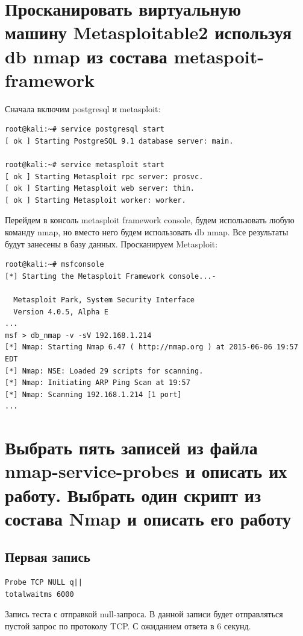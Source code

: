 \documentclass[utf8x, 12pt]{G7-32}
\begin{document}
 \newpage
\section{Просканировать виртуальную машину Metasploitable2 используя db nmap из состава metaspoit-framework}

Сначала включим postgresql и metasploit:

\begin{lstlisting}
root@kali:~# service postgresql start
[ ok ] Starting PostgreSQL 9.1 database server: main.

root@kali:~# service metasploit start
[ ok ] Starting Metasploit rpc server: prosvc.
[ ok ] Starting Metasploit web server: thin.
[ ok ] Starting Metasploit worker: worker.
\end{lstlisting}

Перейдем в консоль metasploit framework console, будем использовать любую команду nmap, но вместо него будем использовать db nmap. Все результаты будут занесены в базу данных. Просканируем Metasploit:

\begin{lstlisting}
root@kali:~# msfconsole
[*] Starting the Metasploit Framework console...-

  Metasploit Park, System Security Interface
  Version 4.0.5, Alpha E
...
msf > db_nmap -v -sV 192.168.1.214
[*] Nmap: Starting Nmap 6.47 ( http://nmap.org ) at 2015-06-06 19:57 EDT
[*] Nmap: NSE: Loaded 29 scripts for scanning.
[*] Nmap: Initiating ARP Ping Scan at 19:57
[*] Nmap: Scanning 192.168.1.214 [1 port]
...
\end{lstlisting}


 \newpage
\section{Выбрать пять записей из файла nmap-service-probes и описать их работу. Выбрать один скрипт из состава Nmap и описать его работу}

\subsection{Первая запись}

\begin{lstlisting}
Probe TCP NULL q||
totalwaitms 6000
\end{lstlisting}

Запись теста с отправкой null-запроса. В данной записи будет отправляться пустой запрос по протоколу TCP. С ожиданием ответа в 6 секунд.
\end{document}
